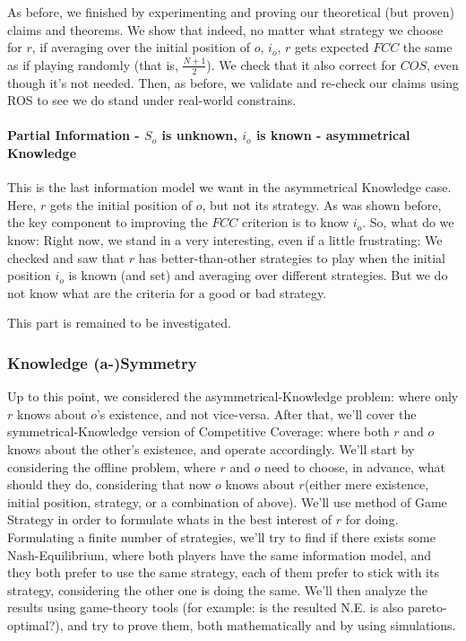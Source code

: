 \documentclass[a4paper,english,10pt]{article}
\newcommand\rob{\ensuremath{r}\xspace}
\newcommand\opp{\ensuremath{o}\xspace}
\newcommand{\fcc}{\ensuremath{FCC}\xspace}
\newcommand{\coos}{\ensuremath{COS}\xspace}
\begin{document}
As before, we finished by experimenting and proving our theoretical (but proven) claims and theorems. We show that indeed, no matter what strategy we choose for \rob, if averaging over the initial position of \opp, $i_\opp$, \rob gets expected \fcc the same as if playing randomly (that is, $\frac{N+1}{2}$).
We check that it also correct for \coos, even though it's not needed.
Then, as before, we validate and re-check our claims using ROS to see we do stand under real-world constrains.

\paragraph{Partial Information - $S_\opp$ is unknown, $i_\opp$ is known - asymmetrical Knowledge} 
This is the last information model we want in the asymmetrical Knowledge case. Here, \rob gets the initial position of \opp, but not its strategy.
As was shown before, the key component to improving the \fcc criterion is to know $i_\opp$. So, what do we know:
Right now, we stand in a very interesting, even if a little frustrating: We checked and saw that \rob has better-than-other strategies to play when the initial position $i_\opp$ is known (and set) and averaging over different strategies. But we do not know what are the criteria for a good or bad strategy.

This part is remained to be investigated. 


\subsubsection{Knowledge (a-)Symmetry}
Up to this point, we considered the asymmetrical-Knowledge problem: where only \rob knows about \opp's existence, and not vice-versa. 
After that, we'll cover the symmetrical-Knowledge version of Competitive Coverage: where both \rob and \opp knows about the other's existence, and operate accordingly.
We'll start by considering the offline problem, where \rob and \opp need to choose, in advance, what should they do, considering that now \opp knows about \rob (either mere existence, initial position, strategy, or a combination of above).
We'll use method of Game Strategy in order to formulate whats in the best interest of \rob for doing. Formulating a finite number of strategies, we'll try to find if there exists some Nash-Equilibrium, where both players have the same information model, and they both prefer to use the same strategy, each of them prefer to stick with its strategy, considering the other one is doing the same. We'll then analyze the results using game-theory tools (for example: is the resulted N.E. is also pareto-optimal?), and try to prove them, both mathematically and by using simulations.
\end{document}
